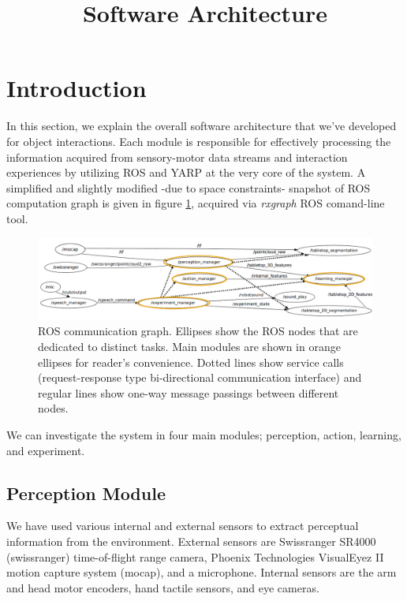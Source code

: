 \documentclass[runningheads,a4paper]{llncs}
\title{\LARGE \bf
Software Architecture
}
\begin{document}
\maketitle
\thispagestyle{empty}
\pagestyle{empty}

\section{Introduction}

In this section, we explain the overall software architecture that we've developed for object interactions. Each module is responsible for effectively processing the information acquired from sensory-motor data streams and interaction experiences by utilizing ROS \cite{ros} and YARP \cite{yarp} at the very core of the system. A simplified and slightly modified -due to space constraints- snapshot of ROS computation graph is given in figure \ref{fig:rxgraph}, acquired via \emph{rxgraph} ROS comand-line tool.

\begin{figure}[htp]
\centering
\includegraphics[width=130mm]{imgs/rx7.png}
\caption{ROS communication graph. Ellipses show the ROS nodes that are dedicated to distinct tasks. Main modules are shown in orange ellipses for reader's convenience. Dotted lines show service calls (request-response type bi-directional communication interface) and regular lines show one-way message passings between different nodes. }
\label{fig:rxgraph}
\end{figure}

We can investigate the system in four main modules; perception, action, learning, and experiment.

\subsection{Perception Module}

We have used various internal and external sensors to extract perceptual information from the environment. External sensors are Swissranger SR4000 (swissranger) time-of-flight range camera, Phoenix Technologies VisualEyez II motion capture system (mocap), and a microphone. Internal sensors are the arm and head motor encoders, hand tactile sensors, and eye cameras.
\end{document}
